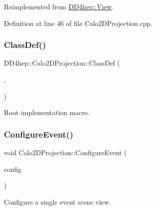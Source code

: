Reimplemented from \hyperlink{class_d_d4hep_1_1_view_ab4e12874a9cb6a599f268b027443c6ce}{D\+D4hep\+::\+View}.



Definition at line 46 of file Calo2\+D\+Projection.\+cpp.

\hypertarget{class_d_d4hep_1_1_calo2_d_projection_a27b84375acec854d3c3fedba3519b7f4}{}\label{class_d_d4hep_1_1_calo2_d_projection_a27b84375acec854d3c3fedba3519b7f4} 
\subsubsection{\texorpdfstring{Class\+Def()}{ClassDef()}}
{\footnotesize\ttfamily D\+D4hep\+::\+Calo2\+D\+Projection\+::\+Class\+Def (\begin{DoxyParamCaption}\item[{\hyperlink{class_d_d4hep_1_1_calo2_d_projection}{Calo2\+D\+Projection}}]{,  }\item[{0}]{ }\end{DoxyParamCaption})}



Root implementation macro. 

\hypertarget{class_d_d4hep_1_1_calo2_d_projection_ab49fa4071160750bd2c82e68b2f6d524}{}\label{class_d_d4hep_1_1_calo2_d_projection_ab49fa4071160750bd2c82e68b2f6d524} 
\subsubsection{\texorpdfstring{Configure\+Event()}{ConfigureEvent()}}
{\footnotesize\ttfamily void Calo2\+D\+Projection\+::\+Configure\+Event (\begin{DoxyParamCaption}\item[{const \hyperlink{class_d_d4hep_1_1_display_configuration_1_1_view_config}{Display\+Configuration\+::\+View\+Config} \&}]{config }\end{DoxyParamCaption})\hspace{0.3cm}{\ttfamily [virtual]}}



Configure a single event scene view. 



